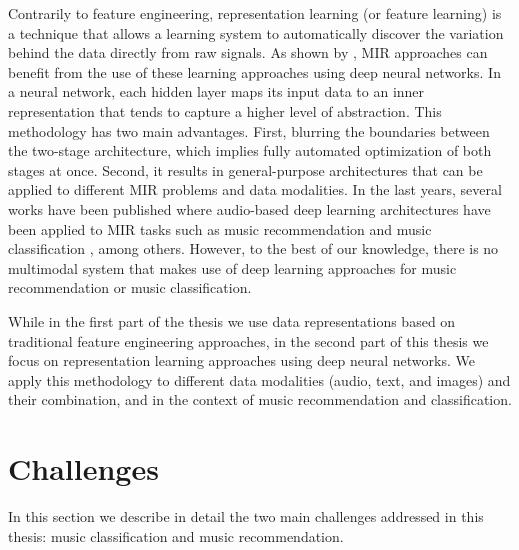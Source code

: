 Contrarily to feature engineering, representation learning (or feature learning) is a technique that allows a learning system to automatically discover the variation behind the data directly from raw signals. As shown by \cite{humphrey2012}, MIR approaches can benefit from the use of these learning approaches using deep neural networks. 
In a neural network, each hidden layer maps its input data to an inner representation that tends to capture a higher level of abstraction.
This methodology has two main advantages. First, blurring the boundaries between the two-stage architecture, which implies fully automated optimization of both stages at once. Second, it results in general-purpose architectures that can be applied to different MIR problems and data modalities. In the last years, several works have been published where audio-based deep learning architectures have been applied to MIR tasks such as music recommendation \citep{Oord2013} and music classification \citep{Choi2016}, among others. However, to the best of our knowledge, there is no multimodal system that makes use of deep learning approaches for music recommendation or music classification.

While in the first part of the thesis we use data representations based on traditional feature engineering approaches, in the second part of this thesis we focus on representation learning approaches using deep neural networks. We apply this methodology to different data modalities (audio, text, and images) and their combination, and in the context of music recommendation and classification.

\section{Challenges}

In this section we describe in detail the two main challenges addressed in this thesis: music classification and music recommendation.

